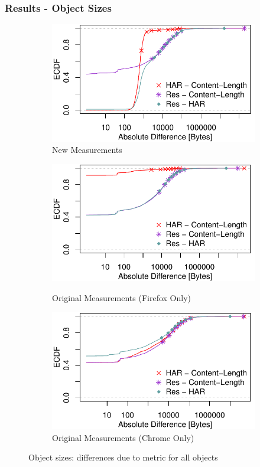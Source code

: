 \begin{frame}
    \frametitle{Results - Object Sizes}
\begin{figure}
 \centering
 \begin{subfigure}{0.5\textwidth}
 \centering
 	 \includegraphics[width=\linewidth,keepaspectratio]{New_Plots/ecdf_diff_objectsizes.pdf}
	\caption{New Measurements}
	\label{fig:new_absolute_byte_index}
	\end{subfigure}%
	 \begin{subfigure}{0.5\textwidth}
	 \centering
	\includegraphics[width=.8\linewidth,keepaspectratio]{Firefox Plots/ecdf_diff_objectsizes.pdf}
	\caption{Original Measurements (Firefox Only)}
	\label{fig:orig_absolute_byte_index}
	\par\medskip
	\includegraphics[width=.8\linewidth,keepaspectratio]{Chrome_Plots/ecdf_diff_objectsizes.pdf}
	\caption{Original Measurements (Chrome Only)}
	\label{fig:orig_chrome_absolute_byte_index}
	\end{subfigure}
\caption{Object sizes: differences due to metric for all objects}
\end{figure}

\end{frame}


